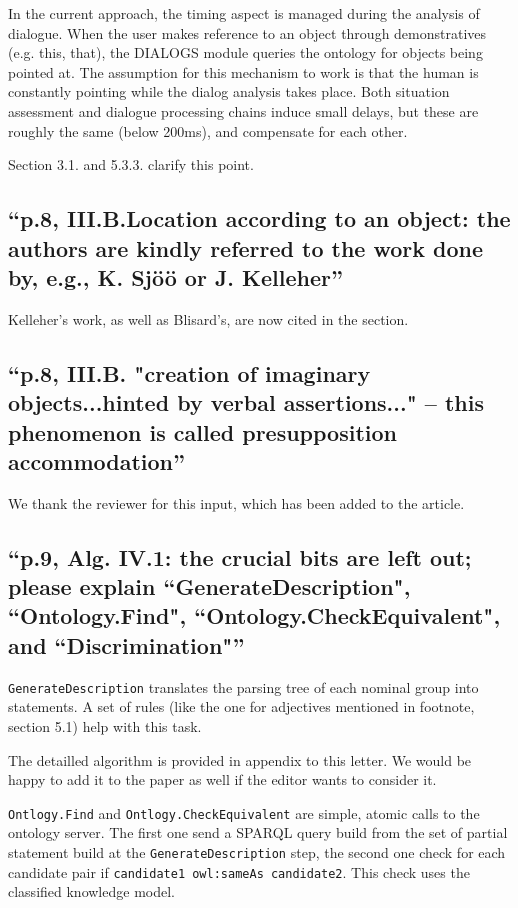 \documentclass[11pt]{article}
\begin{document}
In the current approach, the timing aspect is managed during the analysis of
dialogue. When the user makes reference to an object through demonstratives
(e.g. this, that), the DIALOGS module queries the ontology for objects being
pointed at. The assumption for this mechanism to work is that the human is
constantly pointing while the dialog analysis takes place.  Both situation
assessment and dialogue processing chains induce small delays, but these are
roughly the same (below 200ms), and compensate for each other. 

Section 3.1. and 5.3.3. clarify this point. 

\subsection{``p.8, III.B.Location according to an object: the authors are
kindly referred to the work done by, e.g., K. Sj\"o\"o or J. Kelleher''}

Kelleher's work, as well as Blisard's, are now cited in the section.

\subsection{``p.8, III.B. "creation of imaginary objects...hinted by verbal
assertions..." -- this phenomenon is called presupposition accommodation''}

We thank the reviewer for this input, which has been added to the article.

\subsection{``p.9, Alg. IV.1: the crucial bits are left out; please explain
``GenerateDescription", ``Ontology.Find", ``Ontology.CheckEquivalent", and
``Discrimination"''}

{\tt GenerateDescription} translates the parsing tree of each nominal group
into statements. A set of rules (like the one for adjectives mentioned 
in footnote, section 5.1) help with this task.

The detailled algorithm is provided in appendix to this letter.  We would be
happy to add it to the paper as well if the editor wants to consider it.

{\tt Ontlogy.Find} and {\tt Ontlogy.CheckEquivalent} are simple, atomic calls to
the ontology server. The first one send a SPARQL query build from the set of 
partial statement build at the {\tt GenerateDescription} step, the second
one check for each candidate pair if {\tt candidate1 owl:sameAs candidate2}.
This check uses the classified knowledge model.
\end{document}

